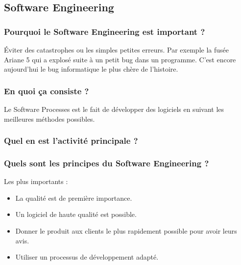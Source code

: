 \subsection{Software Engineering}

\subsubsection{Pourquoi le Software Engineering est important ?}
Éviter des catastrophes ou les simples petites erreurs. Par exemple la fusée Ariane 5 qui a explosé suite à un petit bug dans un programme. C'est encore aujourd'hui
le bug informatique le plus chère de l'histoire.
\subsubsection{En quoi ça consiste ?}
Le Software Processes est le fait de développer des logiciels en suivant les meilleures méthodes possibles.
\subsubsection{Quel en est l'activité principale ?}
\subsubsection{Quels sont les principes du Software Engineering ?}
Les plus importants :
\begin{itemize}
   \item La qualité est de première importance.
   \item Un logiciel de haute qualité est possible.
   \item Donner le produit aux clients le plus rapidement possible pour avoir leurs avis.
   \item Utiliser un processus de développement adapté.
\end{itemize}
